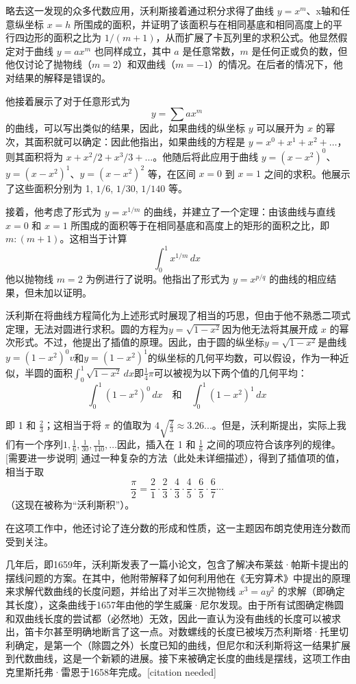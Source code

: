 略去这一发现的众多代数应用，沃利斯接着通过积分求得了曲线 \(y = x^m\)、x轴和任意纵坐标 \(x = h\) 所围成的面积，并证明了该面积与在相同基底和相同高度上的平行四边形的面积之比为 \(1 / (m + 1)\)，从而扩展了卡瓦列里的求积公式。他显然假定对于曲线 \(y = ax^m\) 也同样成立，其中 \(a\) 是任意常数，\(m\) 是任何正或负的数，但他仅讨论了抛物线（\(m = 2\)）和双曲线（\(m = -1\)）的情况。在后者的情况下，他对结果的解释是错误的。

他接着展示了对于任意形式为
\[
y = \sum a x^m~
\]
的曲线，可以写出类似的结果，因此，如果曲线的纵坐标 \(y\) 可以展开为 \(x\) 的幂次，其面积就可以确定：因此他指出，如果曲线的方程是 \(y = x^0 + x^1 + x^2 + \dots\)，则其面积将为 \(x + x^2/2 + x^3/3 + \dots\)。他随后将此应用于曲线 \(y = (x - x^2)^0\)、\(y = (x - x^2)^1\)、\(y = (x - x^2)^2\) 等，在区间 \(x = 0\) 到 \(x = 1\) 之间的求积。他展示了这些面积分别为 1, \(1/6\), \(1/30\), \(1/140\) 等。

接着，他考虑了形式为 \(y = x^{1/m}\) 的曲线，并建立了一个定理：由该曲线与直线 \(x = 0\) 和 \(x = 1\) 所围成的面积等于在相同基底和高度上的矩形的面积之比，即 \(m : (m + 1)\)。这相当于计算
\[
\int_{0}^{1} x^{1/m} \, dx~
\]
他以抛物线 \(m = 2\) 为例进行了说明。他指出了形式为 \(y = x^{p/q}\) 的曲线的相应结果，但未加以证明。

沃利斯在将曲线方程简化为上述形式时展现了相当的巧思，但由于他不熟悉二项式定理，无法对圆进行求积。圆的方程为\(y = \sqrt{1 - x^2}\)因为他无法将其展开成 \(x\) 的幂次形式。不过，他提出了插值的原理。因此，由于圆的纵坐标\(y = \sqrt{1 - x^2}\)是曲线\(y = (1 - x^2)^0v\)和\(y = (1 - x^2)^1\)的纵坐标的几何平均数，可以假设，作为一种近似，半圆的面积\(\int_{0}^{1} \sqrt{1 - x^2} \, dx\)即\(\frac{1}{4} \pi\)可以被视为以下两个值的几何平均：
\[
\int_{0}^{1} (1 - x^2)^0 \, dx \quad \text{和} \quad \int_{0}^{1} (1 - x^2)^1 \, dx~\]

即 1 和 \(\frac{2}{3}\)；这相当于将 \(\pi\) 的值取为 \(4 \sqrt{\frac{2}{3}} \approx 3.26...\)。但是，沃利斯提出，实际上我们有一个序列\(1, \frac{1}{6}, \frac{1}{30}, \frac{1}{140}, \dots\)因此，插入在 1 和 \(\frac{1}{6}\) 之间的项应符合该序列的规律。[需要进一步说明] 通过一种复杂的方法（此处未详细描述），得到了插值项的值，相当于取
\[
\frac{\pi}{2} = \frac{2}{1} \cdot \frac{2}{3} \cdot \frac{4}{3} \cdot \frac{4}{5} \cdot \frac{6}{5} \cdot \frac{6}{7} \cdots~
\]
（这现在被称为“沃利斯积”）。

在这项工作中，他还讨论了连分数的形成和性质，这一主题因布朗克使用连分数而受到关注。

几年后，即1659年，沃利斯发表了一篇小论文，包含了解决布莱兹·帕斯卡提出的摆线问题的方案。在其中，他附带解释了如何利用他在《无穷算术》中提出的原理来求解代数曲线的长度问题，并给出了对半三次抛物线 \(x^3 = ay^2\) 的求解（即确定其长度），这条曲线于1657年由他的学生威廉·尼尔发现。由于所有试图确定椭圆和双曲线长度的尝试都（必然地）无效，因此一直认为没有曲线的长度可以被求出，笛卡尔甚至明确地断言了这一点。对数螺线的长度已被埃万杰利斯塔·托里切利确定，是第一个（除圆之外）长度已知的曲线，但尼尔和沃利斯将这一结果扩展到代数曲线，这是一个新颖的进展。接下来被确定长度的曲线是摆线，这项工作由克里斯托弗·雷恩于1658年完成。[citation needed]

